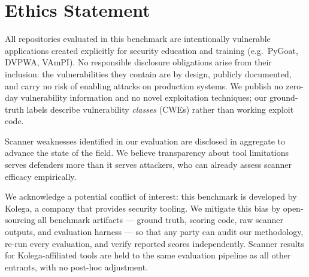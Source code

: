 \section{Ethics Statement}

All repositories evaluated in this benchmark are intentionally vulnerable
applications created explicitly for security education and training (e.g.\
PyGoat, DVPWA, VAmPI).  No responsible disclosure obligations arise from their
inclusion: the vulnerabilities they contain are by design, publicly documented,
and carry no risk of enabling attacks on production systems.  We publish no
zero-day vulnerability information and no novel exploitation techniques;
our ground-truth labels describe vulnerability \emph{classes} (CWEs) rather
than working exploit code.

Scanner weaknesses identified in our evaluation are disclosed in aggregate to
advance the state of the field.  We believe transparency about tool limitations
serves defenders more than it serves attackers, who can already assess scanner
efficacy empirically.

We acknowledge a potential conflict of interest: this benchmark is developed by
Kolega, a company that provides security tooling.  We mitigate this bias by
open-sourcing all benchmark artifacts --- ground truth, scoring code, raw
scanner outputs, and evaluation harness --- so that any party can audit our
methodology, re-run every evaluation, and verify reported scores independently.
Scanner results for Kolega-affiliated tools are held to the same evaluation
pipeline as all other entrants, with no post-hoc adjustment.
